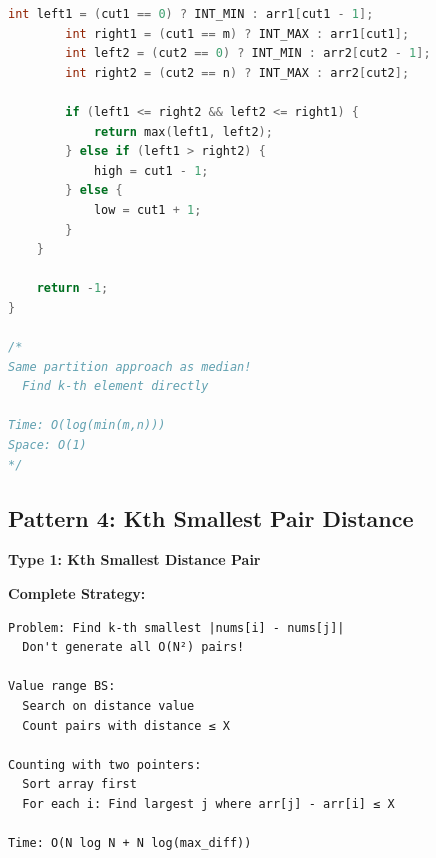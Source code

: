 \documentclass[11pt,a4paper,oneside]{book}
\begin{document}
\begin{lstlisting}[language=C++, caption=Complete Two Array Median Solutions]
        int left1 = (cut1 == 0) ? INT_MIN : arr1[cut1 - 1];
        int right1 = (cut1 == m) ? INT_MAX : arr1[cut1];
        int left2 = (cut2 == 0) ? INT_MIN : arr2[cut2 - 1];
        int right2 = (cut2 == n) ? INT_MAX : arr2[cut2];
        
        if (left1 <= right2 && left2 <= right1) {
            return max(left1, left2);
        } else if (left1 > right2) {
            high = cut1 - 1;
        } else {
            low = cut1 + 1;
        }
    }
    
    return -1;
}

/*
Same partition approach as median!
  Find k-th element directly
  
Time: O(log(min(m,n)))
Space: O(1)
*/
\end{lstlisting}

\subsection{Pattern 4: Kth Smallest Pair Distance}

\begin{tcolorbox}[
    enhanced,breakable,
    colback=dangered!10,
    colframe=dangered,
    boxrule=2pt,
    arc=4mm,
    title=\textbf{Complete Pair Distance Algorithms}
]
\textbf{Type 1: Kth Smallest Distance Pair}

\textbf{Complete Strategy:}
\begin{verbatim}
Problem: Find k-th smallest |nums[i] - nums[j]|
  Don't generate all O(N²) pairs!
  
Value range BS:
  Search on distance value
  Count pairs with distance ≤ X
  
Counting with two pointers:
  Sort array first
  For each i: Find largest j where arr[j] - arr[i] ≤ X
  
Time: O(N log N + N log(max_diff))
\end{verbatim}
\end{tcolorbox}
\end{document}
